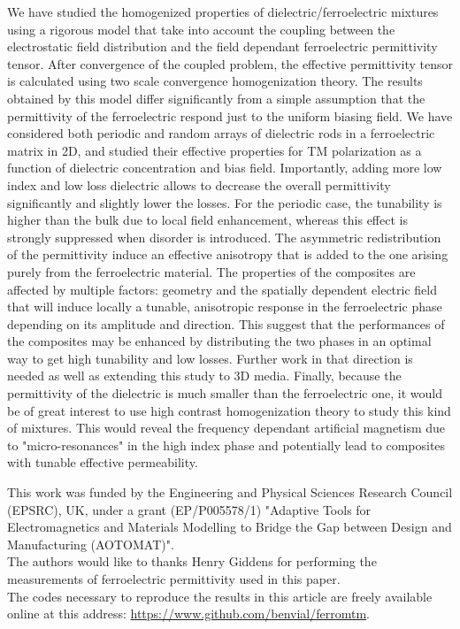 \documentclass[%
 aip,
 amsmath,amssymb,
 reprint,%
]{revtex4-1}
\begin{document}
We have studied the homogenized properties of dielectric/ferroelectric mixtures
using a rigorous model that take into account the coupling between the electrostatic
field distribution and the field dependant ferroelectric permittivity tensor. After
convergence of the coupled problem, the effective permittivity tensor is calculated using
two scale convergence homogenization theory.
The results obtained by this model differ significantly from a simple assumption that
the permittivity of the ferroelectric respond just to the uniform biasing field.
We have considered both periodic and random arrays
of dielectric rods in a ferroelectric matrix in 2D, and studied their effective properties
for TM polarization as a function of dielectric concentration and bias field.
Importantly, adding more low index and low loss dielectric allows to decrease
the overall permittivity significantly and slightly lower the losses.
For the periodic case, the tunability is higher than the bulk due to local field enhancement, whereas
this effect is strongly suppressed when disorder is introduced. The asymmetric redistribution of the permittivity
induce an effective anisotropy that is added to the one arising purely from the ferroelectric material.
The properties of the composites are affected by multiple factors:
geometry and the spatially dependent electric field that will induce locally a tunable, anisotropic
response in the ferroelectric phase depending on its amplitude and direction.
This suggest that the performances of the composites
may be enhanced by distributing the two phases in an optimal way to get high
tunability and low losses. Further work in that direction is needed as well as
extending this study to 3D media.
Finally, because the permittivity of the dielectric is much smaller than the ferroelectric one,
it would be of great interest to use high contrast homogenization theory
\cite{bouchitte_homogenization_2004, cherednichenko_homogenization_2015} to
study this kind of mixtures.
This would reveal the frequency dependant artificial magnetism due to "micro-resonances"
in the high index phase and potentially lead to composites with tunable effective permeability.\\


\begin{acknowledgments}
This work was funded by the Engineering and Physical Sciences Research
Council (EPSRC), UK, under a grant (EP/P005578/1) "Adaptive Tools for
Electromagnetics and Materials Modelling to Bridge the Gap between
Design and Manufacturing (AOTOMAT)".\\
The authors would like to thanks Henry Giddens for performing the
measurements of ferroelectric permittivity used in this paper.\\
%
The codes necessary to reproduce the results in this article are freely
available online at this address: \href{https://www.github.com/benvial/ferromtm}{https://www.github.com/benvial/ferromtm}.
\end{acknowledgments}
\end{document}

